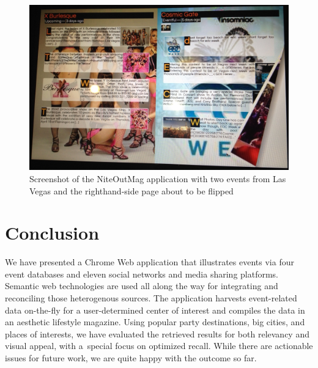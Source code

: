 \documentclass[runningheads,a4paper]{llncs}
\begin{document}
{\begin{figure}[htbp]
\includegraphics[width=1.0\columnwidth]{./screenshot.jpg}
\caption{Screenshot of the NiteOutMag application with two events from Las Vegas and the righthand-side page about to be flipped}
\label{fig:screenshot}
\end{figure}


\section{Conclusion}

We have presented a Chrome Web application that illustrates events via four event databases and eleven social networks and media sharing platforms. Semantic web technologies are used all along the way for integrating and reconciling those heterogenous sources. The application harvests event-related data on-the-fly for a user-determined center of interest and compiles the data in an aesthetic lifestyle magazine. Using popular party destinations, big cities, and places of interests, we have evaluated the retrieved results for both relevancy and visual appeal, with a~special focus on optimized recall. While there are actionable issues for future work, we are quite happy with the outcome so far.

}
\end{document}
